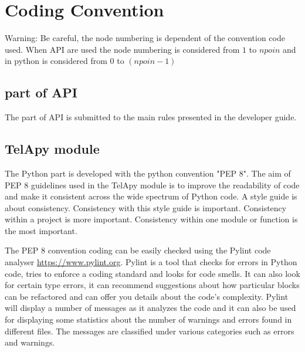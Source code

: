 %
\section{Coding Convention}
%
\begin{WarningBlock}{Warning:}
\centering
Be careful, the node numbering is dependent of the convention code used.
When \fortran API are used the node numbering is considered from
$1$ to $npoin$ and in python is considered from $0$ to $(npoin-1)$
\end{WarningBlock}

\subsection{\fortran part of API}

The \fortran part of \telemacsystem API is submitted to the main rules presented
in the developer guide.

\subsection{TelApy module}

The Python part is developed with the python convention "PEP 8". The aim of
PEP 8 guidelines used in the TelApy module is to improve the readability of
code and make it consistent across the wide spectrum of Python code. A style
guide is about consistency. Consistency with this style guide is important.
Consistency within a project is more important. Consistency within one module
or function is the most important.

The PEP 8 convention coding can be easily checked using the Pylint code
analyser \url{https://www.pylint.org}. Pylint is a tool that checks for
errors in Python code, tries to enforce a coding standard and looks for code
smells. It can also look for certain type errors, it can recommend suggestions
about how particular blocks can be refactored and can offer you details about
the code’s complexity. Pylint will display a number of messages as it analyzes
the code and it can also be used for displaying some statistics about the
number of warnings and errors found in different files. The messages are
classified under various categories such as errors and warnings.

